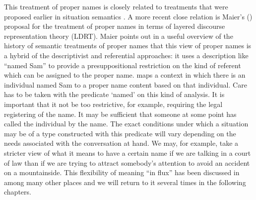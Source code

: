 This treatment of proper names is closely related to treatments that were proposed earlier in situation semantics
\citep{GawronPeters1990,Cooper1991,BarwiseCooper1993}.  A more recent
close relation is Maier's (\citeyear{Maier2009}) proposal for the
treatment of proper names in terms of layered discourse representation
theory (LDRT).  Maier points out in a useful overview of the history
of semantic treatments of proper names that this view of proper
names is a hybrid of the descriptivist and referential approaches:
it uses a description like ``named Sam'' to provide a presuppositional
restriction on the kind of referent which can be assigned to the
proper name.  \preveg{}
maps a context in which there is an individual named Sam to a proper
name content based on that individual.  Care has to be taken with the
predicate `named' on this kind of analysis.  It is important that it
not be too restrictive, for example, requiring the legal registering
of the name.  It may be sufficient that someone at some point has
called the individual by the name.  The exact conditions under which a
situation may be of a type constructed with this predicate will vary
depending on the needs associated with the conversation at hand.  We
may, for example, take a stricter view of what it means to have a
certain name if we are talking in a court of law than if we are trying
to attract somebody's attention to avoid an accident on a
mountainside.  This flexibility of meaning ``in flux'' has been
discussed in \cite{CooperKempson2008,Cooper2012,Ludlow2014,GinzburgCooper2014,KrachtKlein2014} among many other
places and we will return to it several times in the following chapters.

